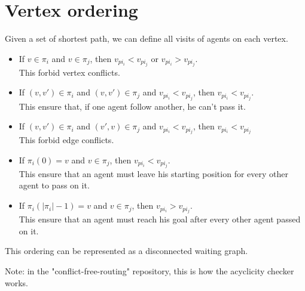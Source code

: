 \section{Vertex ordering}\label{sec:background}

Given a set of shortest path, we can define all visits of agents on each vertex.

\begin{itemize}
  \item If $v \in \pi_i$ and $v \in \pi_j$, then $v_{pi_i}<v_{pi_j}$ or $v_{pi_i}>v_{pi_j}$.
  \\ This forbid vertex conflicts.
  \item If $(v,v') \in \pi_i$ and $(v,v') \in \pi_j$ and $v_{pi_i} < v_{pi_j}$, then $v_{pi_i} < v_{pi_j}$. \\ This ensure that, if one agent follow another, he can't pass it.
  \item If $(v,v') \in \pi_i$ and $(v',v) \in \pi_j$ and $v_{pi_i} < v_{pi_j}$, then $v_{pi_i} < v_{pi_j}$ \\ This forbid edge conflicts.
  \item If $\pi_i(0)=v$ and $v \in \pi_j$, then $v_{pi_i} < v_{pi_j}$. \\ This ensure that an agent must leave his starting position for every other agent to pass on it.
  \item If $\pi_i(|\pi_i|-1)=v$ and $v \in \pi_j$, then $v_{pi_i} > v_{pi_j}$. \\ This ensure that an agent must reach his goal after every other agent passed on it.
\end{itemize}

This ordering can be represented as a disconnected waiting graph.

Note: in the "conflict-free-routing" repository, this is how the acyclicity checker works.
